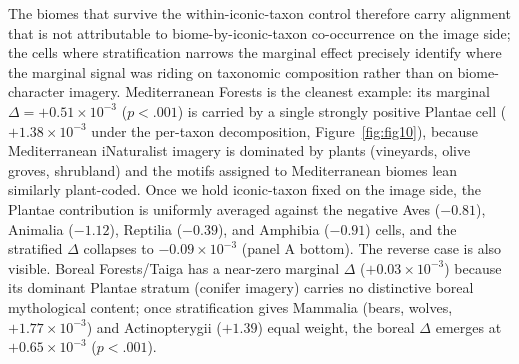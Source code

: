 \documentclass[11pt,a4paper]{article}
\begin{document}
The biomes that survive the within-iconic-taxon control therefore
carry alignment that is not attributable to biome-by-iconic-taxon
co-occurrence on the image side; the cells where stratification
narrows the marginal effect precisely identify where the marginal
signal was riding on taxonomic composition rather than on
biome-character imagery. Mediterranean Forests is the cleanest
example: its marginal $\Delta = +0.51\times 10^{-3}$ ($p<.001$) is
carried by a single strongly positive Plantae cell ($+1.38\times
10^{-3}$ under the per-taxon decomposition, Figure~\ref{fig:fig10}),
because Mediterranean iNaturalist imagery is dominated by plants
(vineyards, olive groves, shrubland) and the motifs assigned to
Mediterranean biomes lean similarly plant-coded. Once we hold
iconic-taxon fixed on the image side, the Plantae contribution is
uniformly averaged against the negative Aves ($-0.81$), Animalia
($-1.12$), Reptilia ($-0.39$), and Amphibia ($-0.91$) cells, and
the stratified $\Delta$ collapses to $-0.09\times 10^{-3}$ (panel
A bottom). The reverse case is also visible. Boreal Forests/Taiga
has a near-zero marginal $\Delta$ ($+0.03\times 10^{-3}$) because
its dominant Plantae stratum (conifer imagery) carries no
distinctive boreal mythological content; once stratification
gives Mammalia (bears, wolves, $+1.77\times 10^{-3}$) and
Actinopterygii ($+1.39$) equal weight, the boreal $\Delta$
emerges at $+0.65\times 10^{-3}$ ($p<.001$).
\end{document}
